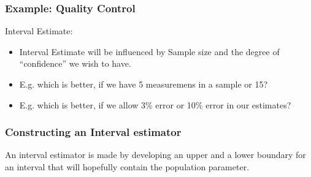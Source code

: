 \begin{frame}[fragile]\frametitle{Example: Quality Control}
Interval Estimate:
\begin{itemize}
\item Interval Estimate will be influenced by Sample size and the degree of ``confidence'' we wish to have.
\item E.g. which is better, if we have 5 measuremens in a sample or 15?
\item E.g. which is better, if we allow 3\% error or 10\% error in our estimates?
\end{itemize}
\end{frame}


\begin{frame}[fragile]\frametitle{Constructing an Interval estimator}
An interval estimator is made by developing an upper and a lower boundary for an interval that will hopefully contain the population parameter.

\end{frame}

%
%
%
%

%
%

